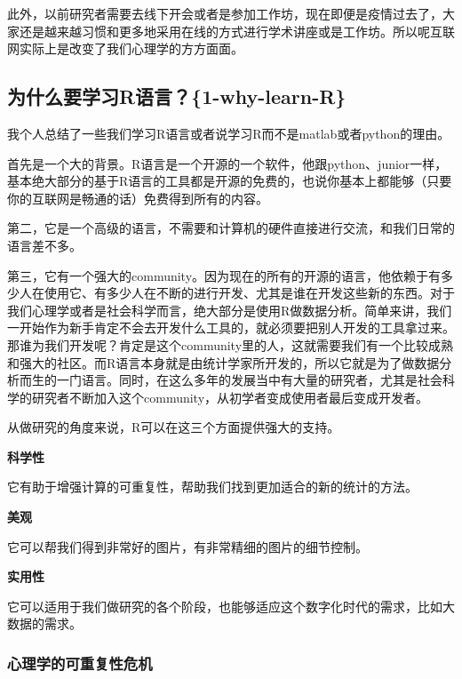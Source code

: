 \documentclass[
  oneside]{book}
\begin{document}
此外，以前研究者需要去线下开会或者是参加工作坊，现在即便是疫情过去了，大家还是越来越习惯和更多地采用在线的方式进行学术讲座或是工作坊。所以呢互联网实际上是改变了我们心理学的方方面面。

\hypertarget{ux4e3aux4ec0ux4e48ux8981ux5b66ux4e60rux8bedux8a001-why-learn-r}{%
\subsection{为什么要学习R语言？\{1-why-learn-R\}}\label{ux4e3aux4ec0ux4e48ux8981ux5b66ux4e60rux8bedux8a001-why-learn-r}}

我个人总结了一些我们学习R语言或者说学习R而不是matlab或者python的理由。

首先是一个大的背景。R语言是一个开源的一个软件，他跟python、junior一样，基本绝大部分的基于R语言的工具都是开源的免费的，也说你基本上都能够（只要你的互联网是畅通的话）免费得到所有的内容。

第二，它是一个高级的语言，不需要和计算机的硬件直接进行交流，和我们日常的语言差不多。

第三，它有一个强大的community。因为现在的所有的开源的语言，他依赖于有多少人在使用它、有多少人在不断的进行开发、尤其是谁在开发这些新的东西。对于我们心理学或者是社会科学而言，绝大部分是使用R做数据分析。简单来讲，我们一开始作为新手肯定不会去开发什么工具的，就必须要把别人开发的工具拿过来。那谁为我们开发呢？肯定是这个community里的人，这就需要我们有一个比较成熟和强大的社区。而R语言本身就是由统计学家所开发的，所以它就是为了做数据分析而生的一门语言。同时，在这么多年的发展当中有大量的研究者，尤其是社会科学的研究者不断加入这个community，从初学者变成使用者最后变成开发者。

从做研究的角度来说，R可以在这三个方面提供强大的支持。

\textbf{科学性}

它有助于增强计算的可重复性，帮助我们找到更加适合的新的统计的方法。

\textbf{美观}

它可以帮我们得到非常好的图片，有非常精细的图片的细节控制。

\textbf{实用性}

它可以适用于我们做研究的各个阶段，也能够适应这个数字化时代的需求，比如大数据的需求。

\hypertarget{ux5fc3ux7406ux5b66ux7684ux53efux91cdux590dux6027ux5371ux673a}{%
\subsubsection{心理学的可重复性危机}\label{ux5fc3ux7406ux5b66ux7684ux53efux91cdux590dux6027ux5371ux673a}}
\end{document}
